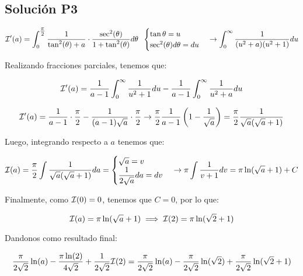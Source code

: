 \begin{CajaTitulo}{\begin{center}\subsection{Solución P3}\end{center}}
    \[\I'(a) = \int_{0}^{\mathlarger{\frac{\pi}{2}}}\frac{1}{\tan^2(\theta) + a}\cdot\frac{\sec^2(\theta)}{1 + \tan^2(\theta)}d\theta \hspace{0.2cm}\cambio{\tan \theta = u} {\sec^2(\theta)d\theta = du} \rightarrow \int_{0}^{\infty} \frac{1}{(u^2 + a)(u^2 + 1)}du\]

    Realizando fracciones parciales, tenemos que:

    \[\mathcal{I}'(a) = \frac{1}{a-1}\int_{0}^{\infty}\frac{1}{u^2 +1}du - \frac{1}{a-1}\int_{0}^{\infty}\frac{1}{u^2 + a}du\]

    \[\mathcal{I}'(a) = \frac{1}{a-1}\cdot \frac{\pi}{2} - \frac{1}{(a-1)\sqrt{a}}\cdot\frac{\pi}{2} \rightarrow \frac{\pi}{2}\frac{1}{a-1}\left(1 - \frac{1}{\sqrt{a}}\right) = \frac{\pi}{2}\frac{1}{\sqrt{a}(\sqrt{a}+1)}\]

    Luego, integrando respecto a $a$ tenemos que:

    \[\I(a) = \frac{\pi}{2}\int\frac{1}{\sqrt{a}(\sqrt{a}+1)}da = \cambio{\sqrt{a} = v}{\mathlarger{\frac{1}{2\sqrt{a}}}da = dv} \rightarrow \pi\int\frac{1}{v+1}dv = \pi\ln(\sqrt{a}+1) + C\]

    Finalmente, como $\mathcal{I}(0) = 0$, tenemos que $C = 0$, por lo que:

    \[\mathcal{I}(a) = \pi\ln(\sqrt{a}+1) \implies \mathcal{I}(2) = \pi \ln(\sqrt{2} +1)\]

    Dandonos como resultado final:

    \[\frac{\pi}{2\sqrt{2}}\ln(a) - \frac{\pi\ln(2)}{4\sqrt{2}} + \frac{1}{2\sqrt{2}}\mathcal{I}(2) = \frac{\pi}{2\sqrt{2}}\ln(a) - \frac{\pi}{2\sqrt{2}} \ln(\sqrt{2}) + \frac{\pi}{2\sqrt{2}}\ln(\sqrt{2} +1)\]

    \vspace{3cm}
\end{CajaTitulo}